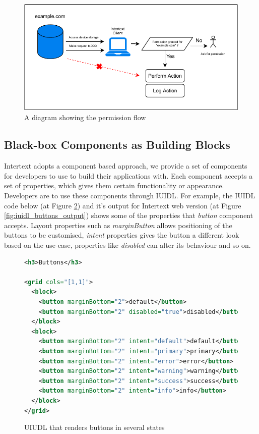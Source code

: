 \begin{figure}
  \centering
  \includegraphics[width=13cm]{thesis/paper/images/permission.pdf}
  \caption{A diagram showing the permission flow}%
  \label{fig:permission_flow}%
\end{figure}


\subsection{Black-box Components as Building Blocks}

Intertext adopts a component based approach, we provide a set of components for developers to use to build their applications with. Each component accepts a set of properties, which gives them certain functionality or appearance. Developers are to use these components through IUIDL. For example, the IUIDL code below (at Figure \ref{fig:iuidl_buttons}) and it's output for Intertext web version (at Figure \ref{fig:iuidl_buttons_output}) shows some of the properties that \textit{button} component accepts. Layout properties such as  \textit{marginButton} allows positioning of the buttons to be customised, \textit{intent} properties gives the button a different look based on the use-case, properties like \textit{disabled} can alter its behaviour and so on.

\begin{figure}
\begin{minipage}{\linewidth}
\begin{lstlisting}[language=xml]
<h3>Buttons</h3>

<grid cols="[1,1]">
  <block>
    <button marginBottom="2">default</button>
    <button marginBottom="2" disabled="true">disabled</button>
  </block>
  <block>
    <button marginBottom="2" intent="default">default</button>
    <button marginBottom="2" intent="primary">primary</button>
    <button marginBottom="2" intent="error">error</button>
    <button marginBottom="2" intent="warning">warning</button>
    <button marginBottom="2" intent="success">success</button>
    <button marginBottom="2" intent="info">info</button>
  </block>
</grid>
\end{lstlisting}
\end{minipage}
\caption{UIUDL that renders buttons in several states}%
\label{fig:iuidl_buttons}%
\end{figure}

